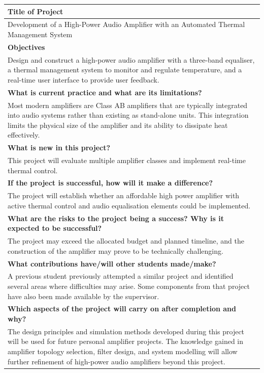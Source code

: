 \documentclass[12pt,a4paper]{report}
\begin{document}
	\begin{center}
		\renewcommand{\arraystretch}{1.2}
		\setlength{\tabcolsep}{6pt}
		\small
		\begin{tabular}{|p{}|}
			\hline
			\centering\textbf{Title of Project}\tabularnewline
			\hline
			Development of a High-Power Audio Amplifier with an Automated Thermal Management System
			\tabularnewline
			\hline
			
			\centering\textbf{Objectives}\tabularnewline
			\hline
			Design and construct a high-power audio amplifier with a three-band equaliser, a thermal management system to monitor and regulate temperature, and a real-time user interface to provide user feedback.
			\tabularnewline
			\hline
			
			\centering\textbf{What is current practice and what are its limitations?}\tabularnewline
			\hline
			Most modern amplifiers are Class AB amplifiers that are typically integrated into audio systems rather than existing as stand-alone units. This integration limits the physical size of the amplifier and its ability to dissipate heat effectively.
			\tabularnewline
			\hline
			
			\centering\textbf{What is new in this project?}\tabularnewline
			\hline
			This project will evaluate multiple amplifier classes and implement real-time thermal control.
			\tabularnewline
			\hline
			
			\centering\textbf{If the project is successful, how will it make a difference?}\tabularnewline
			\hline
			The project will establish whether an affordable high power amplifier with active thermal control and audio equalisation elements could be implemented.
			\tabularnewline
			\hline
			
			\centering\textbf{What are the risks to the project being a success? Why is it expected to be successful?}\tabularnewline
			\hline
			The project may exceed the allocated budget and planned timeline, and the construction of the amplifier may prove to be technically challenging.
			\tabularnewline
			\hline
			
			\centering\textbf{What contributions have/will other students made/make?}\tabularnewline
			\hline
			A previous student previously attempted a similar project and identified several areas where difficulties may arise. Some components from that project have also been made available by the supervisor.
			\tabularnewline
			\hline
			
			\centering\textbf{Which aspects of the project will carry on after completion and why?}\tabularnewline
			\hline
			The design principles and simulation methods developed during this project will be used for future personal amplifier projects. The knowledge gained in amplifier topology selection, filter design, and system modelling will allow further refinement of high-power audio amplifiers beyond this project.
			\tabularnewline
			\hline
			

\end{tabular}
\end{center}
\end{document}
